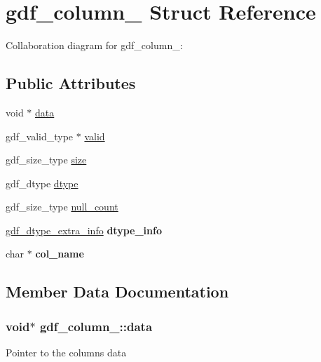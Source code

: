 \hypertarget{structgdf__column__}{}\section{gdf\+\_\+column\+\_\+ Struct Reference}
\label{structgdf__column__}


Collaboration diagram for gdf\+\_\+column\+\_\+\+:
\subsection*{Public Attributes}
\begin{DoxyCompactItemize}
\item 
void $\ast$ \hyperlink{structgdf__column___af1b8c6631a36f6af309c26d1e40accac}{data}
\item 
gdf\+\_\+valid\+\_\+type $\ast$ \hyperlink{structgdf__column___aab16b9467d41db5f36d2a708cba7d612}{valid}
\item 
gdf\+\_\+size\+\_\+type \hyperlink{structgdf__column___a85c0e9161098e1bdf1c56f7657acf8dc}{size}
\item 
gdf\+\_\+dtype \hyperlink{structgdf__column___a3e4d04127fb96d0c7debbe8d4e9d577f}{dtype}
\item 
gdf\+\_\+size\+\_\+type \hyperlink{structgdf__column___a728baf018dbceb2b251332fd313478ec}{null\+\_\+count}
\item 
\hyperlink{structgdf__dtype__extra__info}{gdf\+\_\+dtype\+\_\+extra\+\_\+info} {\bfseries dtype\+\_\+info}\hypertarget{structgdf__column___ab38a744b851e4e6827e69475a25cbbf9}{}\label{structgdf__column___ab38a744b851e4e6827e69475a25cbbf9}

\item 
char $\ast$ {\bfseries col\+\_\+name}\hypertarget{structgdf__column___ae42ce179f2e0abd909f511114a9fdfd6}{}\label{structgdf__column___ae42ce179f2e0abd909f511114a9fdfd6}

\end{DoxyCompactItemize}


\subsection{Member Data Documentation}
\subsubsection[{\texorpdfstring{data}{data}}]{\setlength{\rightskip}{0pt plus 5cm}void$\ast$ gdf\+\_\+column\+\_\+\+::data}\hypertarget{structgdf__column___af1b8c6631a36f6af309c26d1e40accac}{}\label{structgdf__column___af1b8c6631a36f6af309c26d1e40accac}
Pointer to the columns data 
